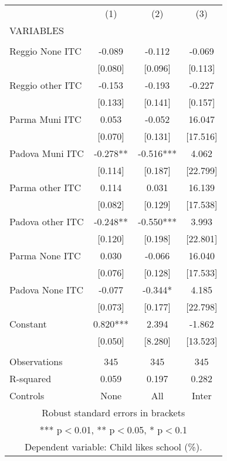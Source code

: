 \begin{tabular}{lccc} \hline
 & (1) & (2) & (3) \\
VARIABLES &  &  &  \\ \hline
 &  &  &  \\
Reggio None ITC & -0.089 & -0.112 & -0.069 \\
 & [0.080] & [0.096] & [0.113] \\
Reggio other ITC & -0.153 & -0.193 & -0.227 \\
 & [0.133] & [0.141] & [0.157] \\
Parma Muni ITC & 0.053 & -0.052 & 16.047 \\
 & [0.070] & [0.131] & [17.516] \\
Padova Muni ITC & -0.278** & -0.516*** & 4.062 \\
 & [0.114] & [0.187] & [22.799] \\
Parma other ITC & 0.114 & 0.031 & 16.139 \\
 & [0.082] & [0.129] & [17.538] \\
Padova other ITC & -0.248** & -0.550*** & 3.993 \\
 & [0.120] & [0.198] & [22.801] \\
Parma None ITC & 0.030 & -0.066 & 16.040 \\
 & [0.076] & [0.128] & [17.533] \\
Padova None ITC & -0.077 & -0.344* & 4.185 \\
 & [0.073] & [0.177] & [22.798] \\
Constant & 0.820*** & 2.394 & -1.862 \\
 & [0.050] & [8.280] & [13.523] \\
 &  &  &  \\
Observations & 345 & 345 & 345 \\
R-squared & 0.059 & 0.197 & 0.282 \\
 Controls & None & All & Inter \\ \hline
\multicolumn{4}{c}{ Robust standard errors in brackets} \\
\multicolumn{4}{c}{ *** p$<$0.01, ** p$<$0.05, * p$<$0.1} \\
\multicolumn{4}{c}{ Dependent variable: Child likes school (\%).} \\
\end{tabular}
